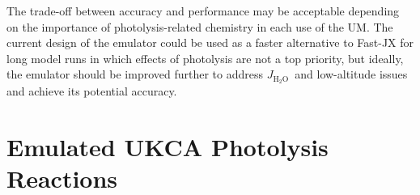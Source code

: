 \documentclass[journal abbreviation, manuscript]{copernicus}
\newcommand{\JHHO}{\ensuremath{J_{\mathrm{H_2O}}}}
\begin{document}
The trade-off between accuracy and performance may be acceptable depending on the importance of photolysis-related chemistry in each use of the UM. The current design of the emulator could be used as a faster alternative to Fast-JX for long model runs in which effects of photolysis are not a top priority, but ideally, the emulator should be improved further to address \JHHO\ and low-altitude issues and achieve its potential accuracy. 






\appendix

\section{Emulated UKCA Photolysis Reactions}\label{rxns}    
\end{document}
